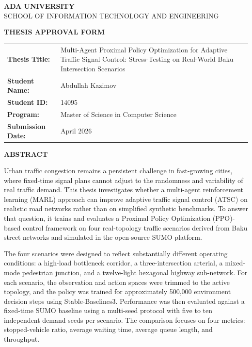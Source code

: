 \documentclass[12pt,oneside,a4paper]{report}
\newcommand{\ppo}{\textsc{PPO}}
\newcommand{\sumo}{\textsc{SUMO}}
\newcommand{\marl}{\textsc{MARL}}
\newcommand{\atsc}{\textsc{ATSC}}
\begin{document}
\clearpage
\thispagestyle{fancy}
\begin{center}
  {\Large\bfseries ADA UNIVERSITY}\\[4pt]
  {\large SCHOOL OF INFORMATION TECHNOLOGY AND ENGINEERING}

  \vspace{0.4in}
  {\large\bfseries THESIS APPROVAL FORM}

  \vspace{0.3in}
  \begin{tabular}{@{}lp{3.8in}@{}}
    \textbf{Thesis Title:} &
      Multi-Agent Proximal Policy Optimization for Adaptive Traffic
      Signal Control: Stress-Testing on Real-World Baku
      Intersection Scenarios \\[10pt]
    \textbf{Student Name:} & Abdullah Kazimov \\[10pt]
    \textbf{Student ID:}   & 14095 \\[10pt]
    \textbf{Program:}      & Master of Science in Computer Science \\[10pt]
    \textbf{Submission Date:} & April 2026 \\
  \end{tabular}
\end{center}

\clearpage
\thispagestyle{fancy}
\begin{center}
  {\Large\bfseries ABSTRACT}
\end{center}

\noindent
Urban traffic congestion remains a persistent challenge in fast-growing
cities, where fixed-time signal plans cannot adjust to the randomness
and variability of real traffic demand. This thesis investigates whether
a multi-agent reinforcement learning (\marl{}) approach can improve
adaptive traffic signal control (\atsc{}) on realistic road networks
rather than on simplified synthetic benchmarks. To answer that question,
it trains and evaluates a Proximal Policy Optimization (\ppo{})-based
control framework on four real-topology traffic scenarios derived from
Baku street networks and simulated in the open-source \sumo{} platform.

The four scenarios were designed to reflect substantially different
operating conditions: a high-load bottleneck corridor, a three-intersection
arterial, a mixed-mode pedestrian junction, and a twelve-light hexagonal
highway sub-network. For each scenario, the observation and action spaces
were trimmed to the active topology, and the policy was trained for
approximately 500{,}000 environment decision steps using Stable-Baselines3.
Performance was then evaluated against a fixed-time \sumo{} baseline using
a multi-seed protocol with five to ten independent demand seeds per
scenario. The comparison focuses on four metrics: stopped-vehicle ratio,
average waiting time, average queue length, and throughput.
\end{document}
